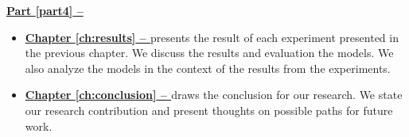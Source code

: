 \vspace{0.5cm}\noindent
\begin{minipage}{\linewidth}
    \textbf{{\hyperref[part4]{Part \ref{part4} -- }}}
    \begin{itemize}
        \item\textbf{\hyperref[ch:results]{Chapter \ref{ch:results} -- }} presents the result of each experiment presented in the previous chapter. We discuss the results and evaluation the models. We also analyze the models in the context of the results from the experiments.
        \item\textbf{\hyperref[ch:conclusion]{Chapter \ref{ch:conclusion} -- }} draws the conclusion for our research. We state our research contribution and present thoughts on possible paths for future work.
    \end{itemize}
\end{minipage}